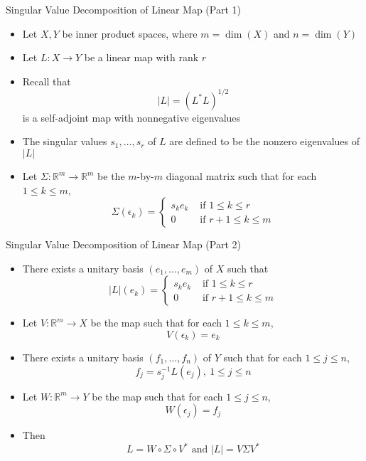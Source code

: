 \documentclass[usenames,dvipsnames,10pt]{beamer}
\newcommand{\R}{\mathbb{R}}
\begin{document}
\begin{frame}
  {Singular Value Decomposition of Linear Map (Part 1)}

  \begin{itemize}
  \item Let $X, Y$ be inner product spaces, where $m = \dim(X)$ and $n=\dim(Y)$
  \item Let $L: X \rightarrow Y$ be a linear map with rank $r$
  \item Recall that
    \[
      |L| = (L^*L)^{1/2}
    \]
    is a self-adjoint map with nonnegative eigenvalues
  \item The singular values $s_1, \dots, s_r$ of $L$ are defined to be the nonzero eigenvalues of $|L|$
  \item Let $\Sigma: \R^m\rightarrow \R^m$ be the $m$-by-$m$ diagonal matrix such that for each $1 \le k \le m$,
    \[ \Sigma(\epsilon_k) = \begin{cases} s_ke_k &\text{ if }1 \le k \le r \\ 0 &\text{ if }r+1 \le k \le m \end{cases} \]
  \end{itemize}
\end{frame}

\begin{frame}
  {Singular Value Decomposition of Linear Map (Part 2)}

  \begin{itemize}
  \item There exists a unitary basis $(e_1, \dots, e_m)$ of $X$ such that
    \[ |L|(e_k) = \begin{cases} s_ke_k &\text{ if }1 \le k \le r \\ 0 &\text{ if }r+1 \le k \le m \end{cases} \]
  \item Let $V: \R^m \rightarrow X$ be the map such that for each $1 \le k \le m$,
    \[ V(\epsilon_k) = e_k \]
  \item There exists a unitary basis $(f_1, \dots, f_n)$ of $Y$ such that for each $1 \le j \le n$,
    \[ f_j = s_j^{-1}L(e_j),\ 1 \le j \le n \]
  \item Let $W: \R^m \rightarrow Y$ be the map such that for each $1 \le j \le n$,
    \[ W(\epsilon_j) = f_j \]
  \item Then
    \[
      L = W\circ\Sigma\circ V^*\text{ and }|L| = V\Sigma V^*
    \]
  \end{itemize}
\end{frame}
\end{document}
